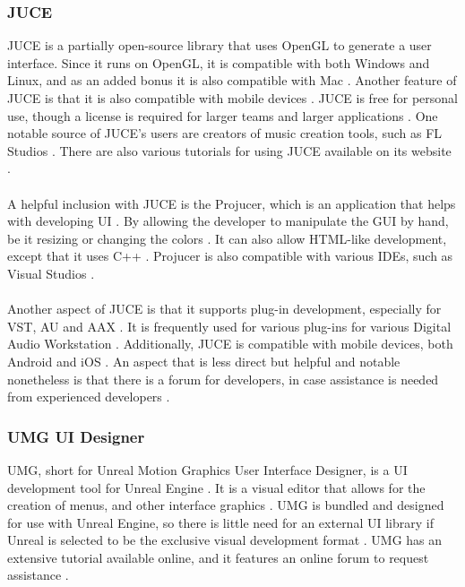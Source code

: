 \documentclass[onecolumn, draftclsnofoot,10pt, compsoc]{IEEEtran}
\begin{document}
\subsubsection{JUCE}
JUCE is a partially open-source library that uses OpenGL to generate a user interface. Since it runs on OpenGL, it is compatible with both Windows and Linux, and as an added bonus it is also compatible with Mac  \cite{1}. Another feature of JUCE is that it is also compatible with mobile devices \cite{1}. JUCE is free for personal use, though a license is required for larger teams and larger applications \cite{1}. One notable source of JUCE's users are creators of music creation tools, such as FL Studios \cite{1}. There are also various tutorials for using JUCE available on its website \cite{1}.
\\
\\
A helpful inclusion with JUCE is the Projucer, which is an application that helps with developing UI \cite{1}. By allowing the developer to manipulate the GUI by hand, be it resizing or changing the colors \cite{1}. It can also allow HTML-like development, except that it uses C++ \cite{1}. Projucer is also compatible with various IDEs, such as Visual Studios \cite{1}.
\\
\\
Another aspect of JUCE is that it supports plug-in development, especially for VST, AU and AAX \cite{1}. It is frequently used for various plug-ins for various Digital Audio Workstation \cite{1}. Additionally, JUCE is compatible with mobile devices, both Android and iOS \cite{1}. An aspect that is less direct but helpful and notable nonetheless is that there is a forum for developers, in case assistance is needed from experienced developers \cite{1}.

\subsubsection{UMG UI Designer}
UMG, short for Unreal Motion Graphics User Interface Designer, is a UI development tool for Unreal Engine \cite{2}. It is a visual editor that allows for the creation of menus, and other interface graphics \cite{2}. UMG is bundled and designed for use with Unreal Engine, so there is little need for an external UI library if Unreal is selected to be the exclusive visual development format \cite{2}. UMG has an extensive tutorial available online, and it features an online forum to request assistance \cite{2}.
\end{document}
